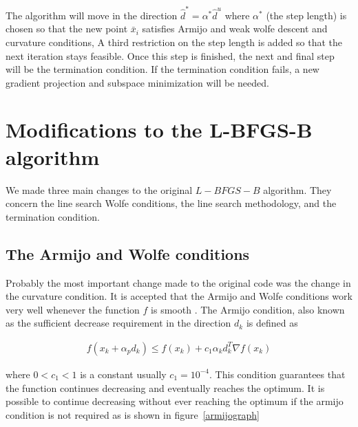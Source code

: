 The algorithm will move in the direction $\hat{d}^* = \alpha^* \hat{d}^u$ where $\alpha^*$ (the step length) is chosen so that the new point $\bar{x}_i$ satisfies Armijo and weak wolfe descent and curvature conditions, A third restriction on the step length is added so that the next iteration stays feasible. Once this step is finished, the next and final step will be the termination condition. If the termination condition fails, a new gradient projection and subspace minimization will be needed.

\chapter{Modifications to the L-BFGS-B algorithm}

We made three main changes to the original $L-BFGS-B$ algorithm. They concern the line search Wolfe conditions, the line search methodology, and the termination condition.

\section{The Armijo and Wolfe conditions} \label{wolfeconditions}

Probably the most important change made to the original code was the change in the curvature condition. It is accepted that the Armijo and Wolfe conditions work very well whenever the function $f$ is smooth \citep{MR1855221}. The Armijo condition, also known as the sufficient decrease requirement in the direction $d_k$ is defined as

\begin{equation} \label{armijocondition}
  \begin{aligned}
    f(x_k + \alpha_p d_k) \leq f(x_k) + c_1 \alpha_k d_k^T \nabla f(x_k)
  \end{aligned}
\end{equation}

where $0 < c_1 < 1$ is a constant usually $c_1 = 10^{-4}$\citep{nocedal}. This condition guarantees that the function continues decreasing and eventually reaches the optimum. It is possible to continue decreasing without ever reaching the optimum if the armijo condition is not required as is shown in figure~\ref{armijograph}

